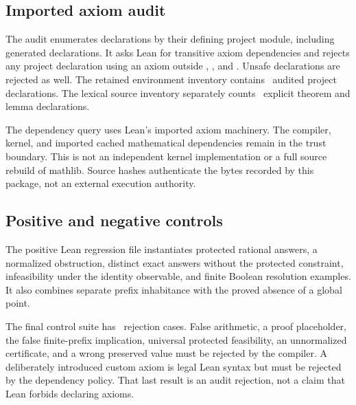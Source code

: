 \documentclass[11pt]{article}
\begin{document}
\subsection{Imported axiom audit}
The audit enumerates declarations by their defining project module, including generated declarations. It asks Lean for transitive axiom dependencies and rejects any project declaration using an axiom outside , , and . Unsafe declarations are rejected as well. The retained environment inventory contains \EditionAuditedDeclarations\ audited project declarations. The lexical source inventory separately counts \EditionFormalTheorems\ explicit theorem and lemma declarations.

The dependency query uses Lean's imported axiom machinery. The compiler, kernel, and imported cached mathematical dependencies remain in the trust boundary. This is not an independent kernel implementation or a full source rebuild of mathlib. Source hashes authenticate the bytes recorded by this package, not an external execution authority.

\subsection{Positive and negative controls}
The positive Lean regression file instantiates protected rational answers, a normalized obstruction, distinct exact answers without the protected constraint, infeasibility under the identity observable, and finite Boolean resolution examples. It also combines separate prefix inhabitance with the proved absence of a global point.

The final control suite has \EditionNegativeControls\ rejection cases. False arithmetic, a proof placeholder, the false finite-prefix implication, universal protected feasibility, an unnormalized certificate, and a wrong preserved value must be rejected by the compiler. A deliberately introduced custom axiom is legal Lean syntax but must be rejected by the dependency policy. That last result is an audit rejection, not a claim that Lean forbids declaring axioms.
\end{document}
